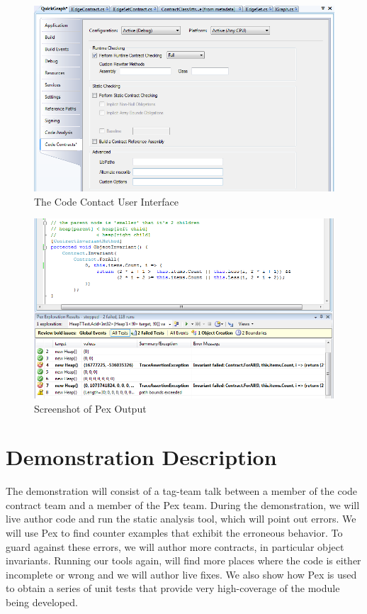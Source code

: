 \documentclass[10pt,twocolumn]{article}
\begin{document}
\begin{figure}[tb]
\begin{center}
  \includegraphics[width=2\columnwidth]{ContractUI.png}
\end{center}
\caption{The Code Contact User Interface}
\label{fig:contractui}
\end{figure}

\begin{figure}[tb]
\begin{center}
  \includegraphics[width=2\columnwidth]{pexscreenshot.png}
\end{center}
\caption{Screenshot of Pex Output}
\label{fig:pexoutput}
\end{figure}

\section{Demonstration Description}
The demonstration will consist of a tag-team talk between a member of
the code contract team and a member of the Pex team. During the
demonstration, we will live author code and run the static analysis
tool, which will point out errors. We will use Pex to find counter
examples that exhibit the erroneous behavior. To guard against these
errors, we will author more contracts, in
particular object invariants. Running our tools again, will find more places
where the code is either incomplete or wrong and we will author live
fixes. We also show how Pex is used to obtain a series of unit tests
that provide very high-coverage of the module being developed.
\end{document}
